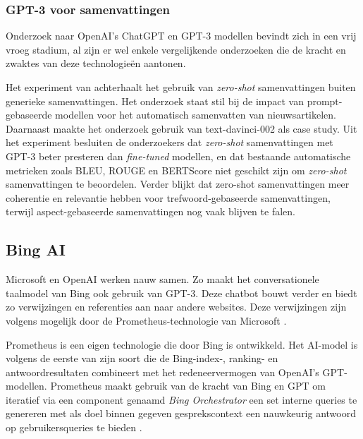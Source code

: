 \subsubsection{GPT-3 voor samenvattingen}





Onderzoek naar OpenAI's ChatGPT en GPT-3 modellen bevindt zich in een vrij vroeg stadium, al zijn er wel enkele vergelijkende onderzoeken die de kracht en zwaktes van deze technologieën aantonen.

Het experiment van \textcite{Goyal2022} achterhaalt het gebruik van \textit{zero-shot} samenvattingen buiten generieke samenvattingen. Het onderzoek staat stil bij de impact van prompt-gebaseerde modellen voor het automatisch samenvatten van nieuwsartikelen. Daarnaast maakte het onderzoek gebruik van text-davinci-002 als case study. Uit het experiment besluiten de onderzoekers dat \textit{zero-shot} samenvattingen met GPT-3 beter presteren dan \textit{fine-tuned} modellen, en dat bestaande automatische metrieken zoals BLEU, ROUGE en BERTScore niet geschikt zijn om \textit{zero-shot} samenvattingen te beoordelen. Verder blijkt dat zero-shot samenvattingen meer coherentie en relevantie hebben voor trefwoord-gebaseerde samenvattingen, terwijl aspect-gebaseerde samenvattingen nog vaak blijven te falen.


\subsection{Bing AI}


Microsoft en OpenAI werken nauw samen. Zo maakt het conversationele taalmodel van Bing ook gebruik van GPT-3. Deze chatbot bouwt verder en biedt zo verwijzingen en referenties aan naar andere websites. Deze verwijzingen zijn volgens mogelijk door de Prometheus-technologie van Microsoft \autocite{Ribas2023}.

Prometheus is een eigen technologie die door Bing is ontwikkeld. Het AI-model is volgens \textcite{Ribas2023} de eerste van zijn soort die de Bing-index-, ranking- en antwoordresultaten combineert met het redeneervermogen van OpenAI’s GPT-modellen. Prometheus maakt gebruik van de kracht van Bing en GPT om iteratief via een component genaamd \textit{Bing Orchestrator} een set interne queries te genereren met als doel binnen gegeven gesprekscontext een nauwkeurig antwoord op gebruikersqueries te bieden \autocite{Ribas2023}.


